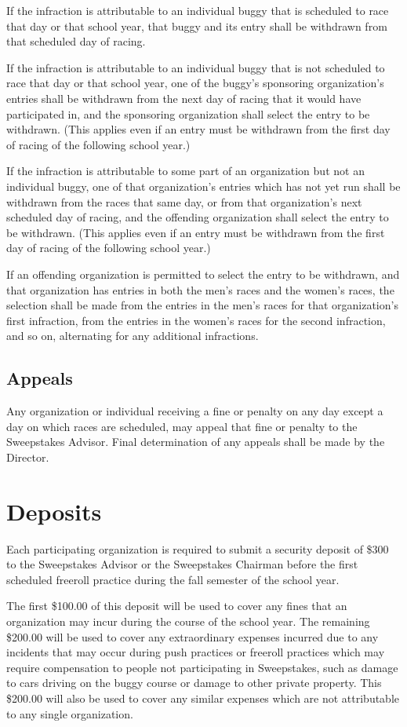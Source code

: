 \documentclass[openany]{book}
\begin{document}
If the infraction is attributable to an individual buggy that is scheduled to race that day or that school year, that buggy and its entry shall be withdrawn from that scheduled day of racing.

If the infraction is attributable to an individual buggy that is not scheduled to race that day or that school year, one of the buggy's sponsoring organization's entries shall be withdrawn from the next day of racing that it would have participated in, and the sponsoring organization shall select the entry to be withdrawn. (This applies even if an entry must be withdrawn from the first day of racing of the following school year.)

If the infraction is attributable to some part of an organization but not an individual buggy, one of that organization's entries which has not yet run shall be withdrawn from the races that same day, or from that organization's next scheduled day of racing, and the offending organization shall select the entry to be withdrawn. (This applies even if an entry must be withdrawn from the first day of racing of the following school year.)

If an offending organization is permitted to select the entry to be withdrawn, and that organization has entries in both the men's races and the women's races, the selection shall be made from the entries in the men's races for that organization's first infraction, from the entries in the women's races for the second infraction, and so on, alternating for any additional infractions.

\subsection{Appeals}
Any organization or individual receiving a fine or penalty on any day except a day on which races are scheduled, may appeal that fine or penalty to the Sweepstakes Advisor. Final determination of any appeals shall be made by the Director.

\section{Deposits}
Each participating organization is required to submit a security deposit of \$300 to the Sweepstakes Advisor or the Sweepstakes Chairman before the first scheduled freeroll practice during the fall semester of the school year.

The first \$100.00 of this deposit will be used to cover any fines that an organization may incur during the course of the school year. The remaining \$200.00 will be used to cover any extraordinary expenses incurred due to any incidents that may occur during push practices or freeroll practices which may require compensation to people not participating in Sweepstakes, such as damage to cars driving on the buggy course or damage to other private property. This \$200.00 will also be used to cover any similar expenses which are not attributable to any single organization.
\end{document}
